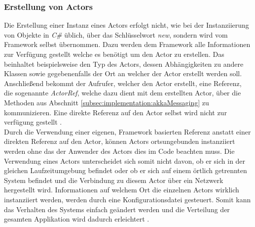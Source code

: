 \subsubsection{Erstellung von Actors}
\label{subsec:implementation:actorCreation}
Die Erstellung einer Instanz eines Actors erfolgt nicht, wie bei der Instanziierung von Objekte in \textit{C\#} üblich, über das Schlüsselwort \textit{new}, sondern wird vom Framework selbst übernommen. Dazu werden dem Framework alle Informationen zur Verfügung gestellt welche es benötigt um den Actor zu erstellen. Das beinhaltet beispielsweise den Typ des Actors, dessen Abhängigkeiten zu andere Klassen sowie gegebenenfalls der Ort an welcher der Actor erstellt werden soll. Anschließend bekommt der Aufrufer, welcher den Actor erstellt, eine Referenz, die sogenannte \textit{ActorRef}, welche dazu dient mit dem erstellten Actor, über die Methoden aus Abschnitt \ref{subsec:implementation:akkaMessaging} zu kommunizieren. Eine direkte Referenz auf den Actor selbst wird nicht zur verfügung gestellt \citep{Akka.netCommunityAkka.NETDocumentation}. \\

Durch die Verwendung einer eigenen, Framework basierten Referenz anstatt einer direkten Referenz auf den Actor, können Actors ortsungebunden instanziiert werden ohne das der Anwender des Actors dies im Code beachten muss. Die Verwendung eines Actors unterscheidet sich somit nicht davon, ob er sich in der gleichen Laufzeitumgebung befindet oder ob er sich auf einem örtlich getrennten System befindet und die Verbindung zu diesem Actor über ein Netzwerk hergestellt wird. Informationen auf welchem Ort die einzelnen Actors wirklich instanziiert werden, werden durch eine Konfigurationsdatei gesteuert. Somit kann das Verhalten des Systems einfach geändert werden und die Verteilung der gesamten Applikation wird dadurch erleichtert .

